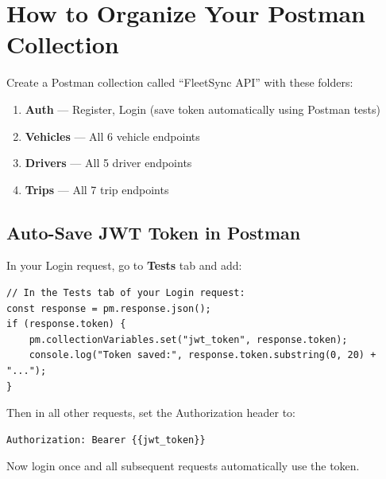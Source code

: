 \documentclass[12pt,a4paper]{report}
\begin{document}
\section{How to Organize Your Postman Collection}

Create a Postman collection called ``FleetSync API'' with these folders:

\begin{enumerate}
  \item \textbf{Auth} --- Register, Login (save token automatically using Postman tests)
  \item \textbf{Vehicles} --- All 6 vehicle endpoints
  \item \textbf{Drivers} --- All 5 driver endpoints
  \item \textbf{Trips} --- All 7 trip endpoints
\end{enumerate}

\subsection{Auto-Save JWT Token in Postman}

In your Login request, go to \textbf{Tests} tab and add:

\begin{lstlisting}[style=bashstyle,caption=Postman Test Script to Auto-Save Token]
// In the Tests tab of your Login request:
const response = pm.response.json();
if (response.token) {
    pm.collectionVariables.set("jwt_token", response.token);
    console.log("Token saved:", response.token.substring(0, 20) + "...");
}
\end{lstlisting}

Then in all other requests, set the Authorization header to:
\begin{lstlisting}[style=bashstyle]
Authorization: Bearer {{jwt_token}}
\end{lstlisting}

Now login once and all subsequent requests automatically use the token.
\end{document}
